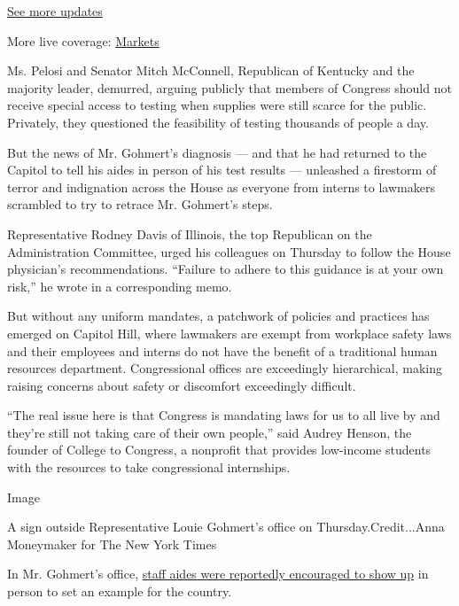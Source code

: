 \href{https://www.nytimes.com/2020/08/01/world/coronavirus-covid-19.html?action=click\&pgtype=Article\&state=default\&region=MAIN_CONTENT_1\&context=storylines_live_updates}{See
more updates}

More live coverage:
\href{https://www.nytimes.com/live/2020/07/31/business/stock-market-today-coronavirus?action=click\&pgtype=Article\&state=default\&region=MAIN_CONTENT_1\&context=storylines_live_updates}{Markets}

Ms. Pelosi and Senator Mitch McConnell, Republican of Kentucky and the
majority leader, demurred, arguing publicly that members of Congress
should not receive special access to testing when supplies were still
scarce for the public. Privately, they questioned the feasibility of
testing thousands of people a day.

But the news of Mr. Gohmert's diagnosis --- and that he had returned to
the Capitol to tell his aides in person of his test results ---
unleashed a firestorm of terror and indignation across the House as
everyone from interns to lawmakers scrambled to try to retrace Mr.
Gohmert's steps.

Representative Rodney Davis of Illinois, the top Republican on the
Administration Committee, urged his colleagues on Thursday to follow the
House physician's recommendations. ``Failure to adhere to this guidance
is at your own risk,'' he wrote in a corresponding memo.

But without any uniform mandates, a patchwork of policies and practices
has emerged on Capitol Hill, where lawmakers are exempt from workplace
safety laws and their employees and interns do not have the benefit of a
traditional human resources department. Congressional offices are
exceedingly hierarchical, making raising concerns about safety or
discomfort exceedingly difficult.

``The real issue here is that Congress is mandating laws for us to all
live by and they're still not taking care of their own people,'' said
Audrey Henson, the founder of College to Congress, a nonprofit that
provides low-income students with the resources to take congressional
internships.

Image

A sign outside Representative Louie Gohmert's office on
Thursday.Credit...Anna Moneymaker for The New York Times

In Mr. Gohmert's office,
\href{https://twitter.com/JakeSherman/status/1288524502649966592?s=20}{staff
aides were reportedly encouraged to show up} in person to set an example
for the country.

